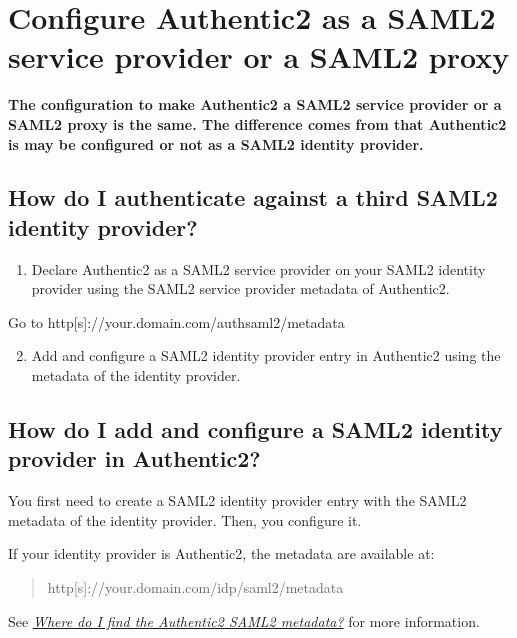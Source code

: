 \documentclass[letterpaper,10pt,english]{sphinxmanual}
\begin{document}
\section{Configure Authentic2 as a SAML2 service provider or a SAML2 proxy}
\label{config_saml2_idp:config-saml2-idp}\label{config_saml2_idp::doc}\label{config_saml2_idp:configure-authentic2-as-a-saml2-service-provider-or-a-saml2-proxy}
\textbf{The configuration to make Authentic2 a SAML2 service provider or a SAML2
proxy is the same. The difference comes from that Authentic2 is may be
configured or not as a SAML2 identity provider.}


\subsection{How do I authenticate against a third SAML2 identity provider?}
\label{config_saml2_idp:how-do-i-authenticate-against-a-third-saml2-identity-provider}\begin{enumerate}
\item {} 
Declare Authentic2 as a SAML2 service provider on your SAML2 identity provider using the SAML2 service provider metadata of Authentic2.

\end{enumerate}

Go to http{[}s{]}://your.domain.com/authsaml2/metadata
\begin{enumerate}
\setcounter{enumi}{1}
\item {} 
Add and configure a SAML2 identity provider entry in Authentic2 using the metadata of the identity provider.

\end{enumerate}


\subsection{How do I add and configure a SAML2 identity provider in Authentic2?}
\label{config_saml2_idp:how-do-i-add-and-configure-a-saml2-identity-provider-in-authentic2}
You first need to create a SAML2 identity provider entry with the SAML2
metadata of the identity provider. Then, you configure it.

If your identity provider is Authentic2, the metadata are available at:
\begin{quote}

http{[}s{]}://your.domain.com/idp/saml2/metadata
\end{quote}

See {\hyperref[where_metadata:where-metadata]{\emph{Where do I find the Authentic2 SAML2 metadata?}}} for more information.
\end{document}
